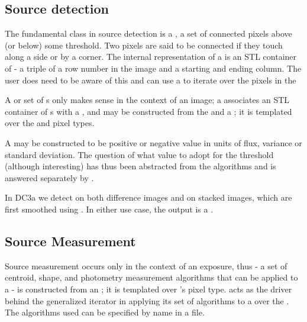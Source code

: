 \subsection{Source detection}

The fundamental class in source detection is a , a set of 
connected pixels above (or below) some threshold. Two pixels are said to be 
connected if they touch along a side or by a corner. The internal 
representation of a  is an STL container of  - 
a triple of a row number in the image and a starting and ending column. The 
user does need to be aware of this and can use a  to
iterate over the pixels in the 

A  or set of s only makes sense in the 
context of an image; a  associates an STL container of 
s with a , and may be constructed from 
the  and a ; it is templated over the 
 and  pixel types.

A  may be constructed to be positive or negative value in 
units of flux, variance or standard deviation. The question of what value to 
adopt for the threshold (although interesting) has thus been abstracted from 
the algorithms and is answered separately by . 

In DC3a we detect on both difference images and on stacked images, which are 
first smoothed using . In either use case, the output
is a .

\subsection{Source Measurement}

Source measurement occurs only in the context of an exposure, thus 
 - a set of centroid, shape, and photometry measurement 
algorithms that can be applied to a  - is constructed from an 
; it is templated over 's pixel type. 
  acts as the driver behind the generalized 
 iterator  in applying its set of 
algorithms to a  over the . The algorithms 
used can be specified by name in a  file.


